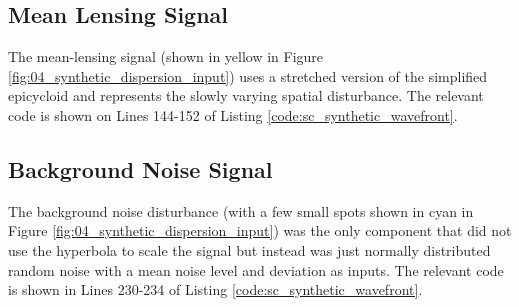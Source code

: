 \subsection{Mean Lensing Signal}
The mean-lensing signal (shown in yellow in Figure \ref{fig:04_synthetic_dispersion_input}) uses a stretched version of the simplified epicycloid and represents the slowly varying spatial disturbance.
The relevant code is shown on Lines 144-152 of Listing \ref{code:sc_synthetic_wavefront}.
% 

\subsection{Background Noise Signal}
The background noise disturbance (with a few small spots shown in cyan in Figure \ref{fig:04_synthetic_dispersion_input}) was the only component that did not use the hyperbola to scale the signal but instead was just normally distributed random noise with a mean noise level and deviation as inputs.
The relevant code is shown in Lines 230-234 of Listing \ref{code:sc_synthetic_wavefront}.
% 

